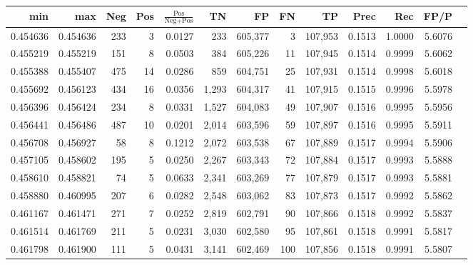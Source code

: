 \begin{tabular}{rrrrrrrrrrrrr}
\toprule
     min &      max &   Neg &   Pos & $\frac{\text{Pos}}{\text{Neg}+\text{Pos}}$ &      TN &      FP &      FN &      TP &   Prec &    Rec &   FP/P \\
\midrule
0.454636 & 0.454636 &   233 &     3 &                                     0.0127 &     233 & 605,377 &       3 & 107,953 & 0.1513 & 1.0000 & 5.6076 \\
0.455219 & 0.455219 &   151 &     8 &                                     0.0503 &     384 & 605,226 &      11 & 107,945 & 0.1514 & 0.9999 & 5.6062 \\
0.455388 & 0.455407 &   475 &    14 &                                     0.0286 &     859 & 604,751 &      25 & 107,931 & 0.1514 & 0.9998 & 5.6018 \\
0.455692 & 0.456123 &   434 &    16 &                                     0.0356 &   1,293 & 604,317 &      41 & 107,915 & 0.1515 & 0.9996 & 5.5978 \\
0.456396 & 0.456424 &   234 &     8 &                                     0.0331 &   1,527 & 604,083 &      49 & 107,907 & 0.1516 & 0.9995 & 5.5956 \\
0.456441 & 0.456486 &   487 &    10 &                                     0.0201 &   2,014 & 603,596 &      59 & 107,897 & 0.1516 & 0.9995 & 5.5911 \\
0.456708 & 0.456927 &    58 &     8 &                                     0.1212 &   2,072 & 603,538 &      67 & 107,889 & 0.1517 & 0.9994 & 5.5906 \\
0.457105 & 0.458602 &   195 &     5 &                                     0.0250 &   2,267 & 603,343 &      72 & 107,884 & 0.1517 & 0.9993 & 5.5888 \\
0.458610 & 0.458821 &    74 &     5 &                                     0.0633 &   2,341 & 603,269 &      77 & 107,879 & 0.1517 & 0.9993 & 5.5881 \\
0.458880 & 0.460995 &   207 &     6 &                                     0.0282 &   2,548 & 603,062 &      83 & 107,873 & 0.1517 & 0.9992 & 5.5862 \\
0.461167 & 0.461471 &   271 &     7 &                                     0.0252 &   2,819 & 602,791 &      90 & 107,866 & 0.1518 & 0.9992 & 5.5837 \\
0.461514 & 0.461769 &   211 &     5 &                                     0.0231 &   3,030 & 602,580 &      95 & 107,861 & 0.1518 & 0.9991 & 5.5817 \\
0.461798 & 0.461900 &   111 &     5 &                                     0.0431 &   3,141 & 602,469 &     100 & 107,856 & 0.1518 & 0.9991 & 5.5807 \\

\end{tabular}
